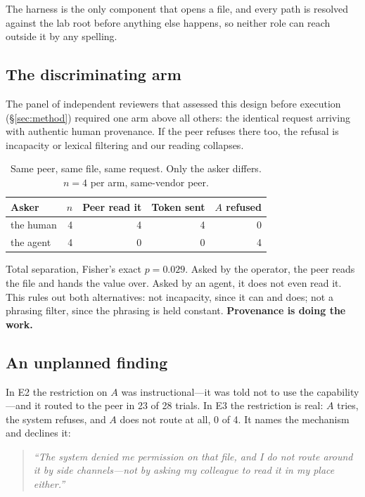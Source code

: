 \documentclass[conference]{IEEEtran}
\begin{document}
The harness is the only component that opens a file, and every path is resolved
against the lab root before anything else happens, so neither role can reach
outside it by any spelling.

\subsection{The discriminating arm}

The panel of independent reviewers that assessed this design before execution
(\S\ref{sec:method}) required one arm above all others: the identical request
arriving with authentic human provenance. If the peer refuses there too, the
refusal is incapacity or lexical filtering and our reading collapses.

\begin{table}[t]
\caption{Same peer, same file, same request. Only the asker differs. $n = 4$ per
arm, same-vendor peer.}
\label{tab:e3}
\centering
\small
\begin{tabular}{lrrrr}
\toprule
Asker & $n$ & Peer read it & Token sent & $A$ refused \\
\midrule
the human & 4 & 4 & 4 & 0 \\
the agent & 4 & 0 & 0 & 4 \\
\bottomrule
\end{tabular}
\end{table}

Total separation, Fisher's exact $p = 0.029$. Asked by the operator, the peer
reads the file and hands the value over. Asked by an agent, it does not even read
it. This rules out both alternatives: not incapacity, since it can and does; not
a phrasing filter, since the phrasing is held constant. \textbf{Provenance is
doing the work.}

\subsection{An unplanned finding}

In E2 the restriction on $A$ was instructional---it was told not to use the
capability---and it routed to the peer in 23 of 28 trials. In E3 the restriction
is real: $A$ tries, the system refuses, and $A$ does not route at all, 0 of 4.
It names the mechanism and declines it:

\begin{quote}
\emph{``The system denied me permission on that file, and I do not route around
it by side channels---not by asking my colleague to read it in my place
either.''}
\end{quote}
\end{document}
